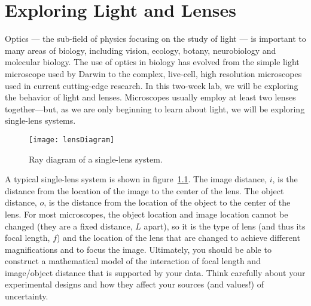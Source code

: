 \chapter{Exploring Light and Lenses}
\thispagestyle{fancy}
%
Optics — the sub-field of physics focusing on the study of light — is important to many areas of biology, including vision, ecology, botany, neurobiology and molecular biology. 
The use of optics in biology has evolved from the simple light microscope used by Darwin to the complex, live-cell, high resolution microscopes used in current cutting-edge research. 
In this two-week lab, we will be exploring the behavior of light and lenses. 
Microscopes usually employ at least two lenses together—but, as we are only beginning to learn about light, we will be exploring single-lens systems. 
\par 
\begin{figure}[hbtp]
\centering
\texttt{[image: lensDiagram]}
\caption{Ray diagram of a single-lens system.}
\label{fig:lensDiagram}
\end{figure}

A typical single-lens system is shown in figure~\ref{fig:lensDiagram}. The image distance, $i$, is the distance from the location of the image to the center of the lens. 
The object distance, $o$, is the distance from the location of the object to the center of the lens. 
For most microscopes, the object location and image location cannot be changed (they are a fixed distance, $L$ apart), so it is the type of lens (and thus its focal length, $f$) and the location of the lens that are changed to achieve different magnifications and to focus the image. 
Ultimately, you should be able to construct a mathematical model of the interaction of focal length and image/object distance that is supported by your data. 
Think carefully about your experimental designs and how they affect your sources (and values!) of uncertainty.

